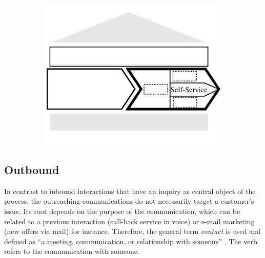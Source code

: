 	\begin{figure}[caption={Self-Service process}, label={fig:selfservice}]
		\begin{subfigure}[b]{.45\textwidth}
			\begin{center}
				\includegraphics{figures/self-service.pdf}
			\end{center}
		\end{subfigure}
		\begin{subfigure}[b]{.45\textwidth}
			\begin{center}
			\end{center}
		\end{subfigure}
		
	\end{figure}
		\newpage
	\newpage
	
	\subsection{Outbound}
		
		In contrast to inbound interactions that have an inquiry as central object of the process, the outreaching communications do not necessarily target a customer's issue. Its root depends on the purpose of the communication, which can be related to a previous interaction (call-back service in voice) or e-mail marketing (new offers via mail) for instance. Therefore, the general term \textit{contact} is used and defined as \enquote{a meeting, communication, or relationship with someone} \citep{oxfordcontact}. The verb refers to the communication with someone.
		
